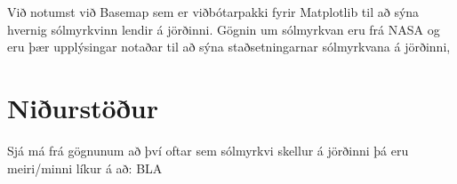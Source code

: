 \documentclass[12pt, git, final]{rureport}
\begin{document}
Við notumst við Basemap\cite{basemap} sem er viðbótarpakki fyrir Matplotlib til að sýna hvernig sólmyrkvinn lendir á jörðinni. Gögnin um sólmyrkvan eru frá NASA og eru þær upplýsingar notaðar til að sýna staðsetningarnar sólmyrkvana á jörðinni,


\section{Niðurstöður}\label{nidurstodur}
Sjá má frá gögnunum að því oftar sem sólmyrkvi skellur á  jörðinni þá eru meiri/minni líkur á að: BLA



\pagebreak


\clearpage
\printbibliography
\end{document}
